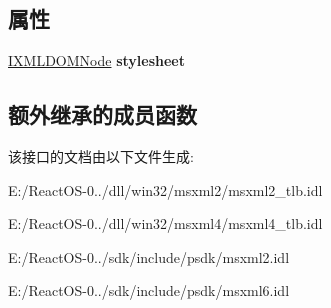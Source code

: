 \subsection*{属性}
\begin{DoxyCompactItemize}
\item 
\mbox{\label{interface_m_s_x_m_l2_1_1_i_x_s_l_template_a635458aeb7cc872c0e1e6fbcc58ca500}} 
\hyperlink{interface_m_s_x_m_l2_1_1_i_x_m_l_d_o_m_node}{I\+X\+M\+L\+D\+O\+M\+Node} {\bfseries stylesheet}
\end{DoxyCompactItemize}
\subsection*{额外继承的成员函数}


该接口的文档由以下文件生成\+:\begin{DoxyCompactItemize}
\item 
E\+:/\+React\+O\+S-\/0../dll/win32/msxml2/msxml2\+\_\+tlb.\+idl\item 
E\+:/\+React\+O\+S-\/0../dll/win32/msxml4/msxml4\+\_\+tlb.\+idl\item 
E\+:/\+React\+O\+S-\/0../sdk/include/psdk/msxml2.\+idl\item 
E\+:/\+React\+O\+S-\/0../sdk/include/psdk/msxml6.\+idl\end{DoxyCompactItemize}
